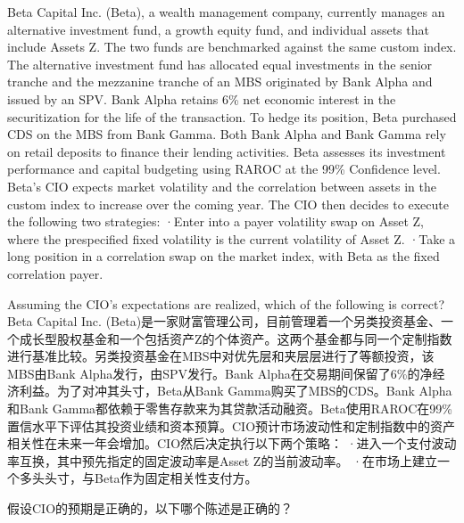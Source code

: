 \documentclass{article}
\newcounter{question} %
\begin{document}
\begin{question}
    Beta Capital Inc. (Beta), a wealth management company, currently manages an alternative investment fund, a growth equity fund, and individual assets that include Assets Z. The two funds are benchmarked against the same custom index. The alternative investment fund has allocated equal investments in the senior tranche and the mezzanine tranche of an MBS originated by Bank Alpha and issued by an SPV. Bank Alpha retains 6\% net economic interest in the securitization for the life of the transaction. To hedge its position, Beta purchased CDS on the MBS from Bank Gamma. Both Bank Alpha and Bank Gamma rely on retail deposits to finance their lending activities. Beta assesses its investment performance and capital budgeting using RAROC at the 99\% Confidence level. Beta's CIO expects market volatility and the correlation between assets in the custom index to increase over the coming year. The CIO then decides to execute the following two strategies:
    ·Enter into a payer volatility swap on Asset Z, where the prespecified fixed volatility is the current volatility of Asset Z.
    ·Take a long position in a correlation swap on the market index, with Beta as the fixed correlation payer.

    Assuming the CIO's expectations are realized, which of the following is correct?
    \\Beta Capital Inc. (Beta)是一家财富管理公司，目前管理着一个另类投资基金、一个成长型股权基金和一个包括资产Z的个体资产。这两个基金都与同一个定制指数进行基准比较。另类投资基金在MBS中对优先层和夹层层进行了等额投资，该MBS由Bank Alpha发行，由SPV发行。Bank Alpha在交易期间保留了6\%的净经济利益。为了对冲其头寸，Beta从Bank Gamma购买了MBS的CDS。Bank Alpha和Bank Gamma都依赖于零售存款来为其贷款活动融资。Beta使用RAROC在99\%置信水平下评估其投资业绩和资本预算。CIO预计市场波动性和定制指数中的资产相关性在未来一年会增加。CIO然后决定执行以下两个策略：
    ·进入一个支付波动率互换，其中预先指定的固定波动率是Asset Z的当前波动率。
    ·在市场上建立一个多头头寸，与Beta作为固定相关性支付方。

    假设CIO的预期是正确的，以下哪个陈述是正确的？
\end{question}
\end{document}
